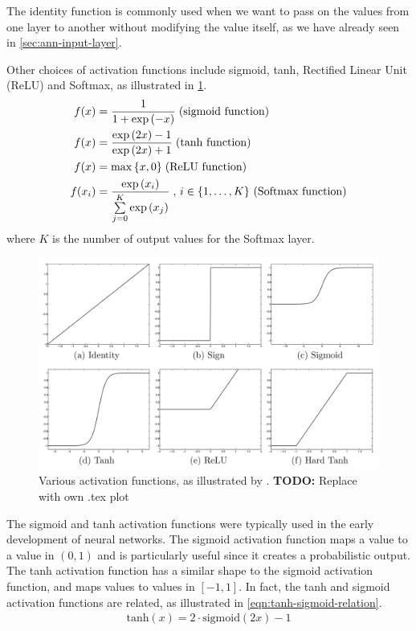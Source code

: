 The identity function is commonly used when we want to pass on the values from one layer to another without modifying the value itself, as we have already seen in \cref{sec:ann-input-layer}.

Other choices of activation functions include  sigmoid, tanh, Rectified Linear Unit (ReLU) and Softmax, as illustrated in \cref{fig:activation-functions}.
\begin{align}
    f(x) &= \frac{1}{1 + \exp{ \left( -x \right) }} \thickspace \text{(sigmoid function)} \\
    f(x) &= \frac{\exp{ \left( 2x \right) } - 1}{\exp{ \left( 2x \right) } + 1} \thickspace \text{(tanh function)} \\
    f(x) &= \max{\left\{ x, 0 \right\}} \thickspace \text{(ReLU function)} \\
    f(x_i) &= \frac{\exp \left( x_i \right)}{\sum\limits_{j=0}^{K} \exp \left( x_j \right)} \thickspace \text{, $i \in \left\{ 1, \ldots, K \right\}$ (Softmax function)} \label{eqn:softmax-activation-function}
\end{align}
where $K$ is the number of output values for the Softmax layer.

\begin{figure}[H]
    \centering
    \includegraphics[width=13cm]{thesis/figures/activation-functions-aggarwal-2018.png}
    \caption{Various activation functions, as illustrated by \cite[Figure 1.8]{Aggarwal18}. \textbf{TODO:} Replace with own .tex plot}
    \label{fig:activation-functions}
\end{figure}

The sigmoid and tanh activation functions were typically used in the early development of neural networks. The sigmoid activation function maps a value to a value in $(0, 1)$ and is particularly useful since it creates a probabilistic output. The tanh activation function has a similar shape to the sigmoid activation function, and maps values to values in $[-1, 1]$. In fact, the tanh and sigmoid activation functions are related, as illustrated in \cref{eqn:tanh-sigmoid-relation}.
\begin{align}
    \label{eqn:tanh-sigmoid-relation}
    \text{tanh}(x) = 2 \cdot \text{sigmoid}(2x) - 1
\end{align}

